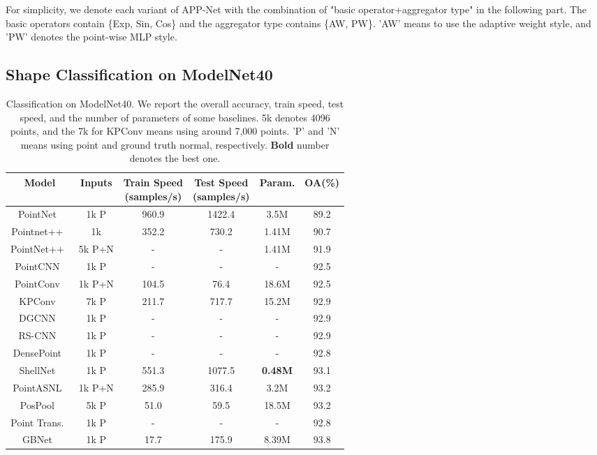 \documentclass[journal]{IEEEtran}
\begin{document}
For simplicity, we denote each variant of APP-Net with the combination of "basic operator+aggregator type" in the following part. The basic operators contain \{Exp, Sin, Cos\} and the aggregator type contains \{AW, PW\}. 'AW' means to use the adaptive weight style, and 'PW' denotes the point-wise MLP style.

\subsection{Shape Classification on ModelNet40}


\begin{table*}[t]
\begin{center}
	\caption{Classification on ModelNet40. We report the overall accuracy, train speed, test speed, and the number of parameters of some baselines. 5k denotes 4096 points, and the 7k for KPConv means using around 7,000 points. 'P' and 'N' means using point and ground truth normal, respectively. {\bf Bold} number denotes the best one.}\label{tab:mn40}
\begin{tabular}{c|c|c|c|c|c}
\hline
Model      & Inputs  &\makecell[c]{Train Speed\\(samples/s)}  & \makecell[c]{Test Speed\\(samples/s)}  & Param. & OA(\%)\\ \hline
PointNet~\cite{PointNet}&1k P&960.9&1422.4&3.5M&89.2\\
Pointnet++~\cite{PointNet++}&1k &352.2&730.2&1.41M&90.7\\
PointNet++~\cite{PointNet++}&5k P+N&-&-&1.41M&91.9\\
PointCNN~\cite{pointcnn}&1k P&-&-&-&92.5\\
PointConv~\cite{pointconv} &1k P+N&104.5&76.4&18.6M&92.5\\
KPConv~\cite{KPConv}&7k P&211.7&717.7&15.2M& 92.9\\
DGCNN~\cite{DGCNN}&1k P&-&-&-&92.9\\
RS-CNN~\cite{liu2019relation}&1k P&-&-&-&92.9\\
DensePoint~\cite{liu2019densepoint}&1k P&-&-&-&92.8\\
ShellNet~\cite{shellnet}&1k P&551.3&1077.5&{\bf0.48M}&93.1\\
PointASNL~\cite{PointASNL}&1k P+N&285.9&316.4&3.2M&93.2\\
PosPool~\cite{closerlook3d}&5k P&51.0&59.5&18.5M&93.2\\
Point Trans.~\cite{engel2021point} &1k P&-&-&-&92.8\\
GBNet~\cite{qiu2021geometric}& 1k P&17.7&175.9&8.39M&{93.8}\\

\end{tabular}
\end{center}
\end{table*}
\end{document}
